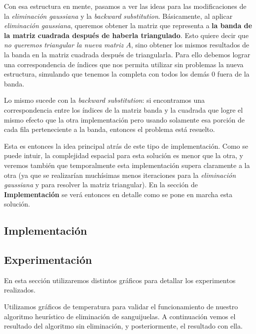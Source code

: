 \vspace{\baselineskip}

\vspace{\baselineskip}
\par

Con esa estructura en mente, pasamos a ver las ideas para las modificaciones de la \textit{eliminación gaussiana} y la \textit{backward substitution}. Básicamente, al aplicar \textit{eliminación gaussiana}, queremos obtener la matriz que representa a \textbf{la banda de la matriz cuadrada después de haberla triangulado}. Esto quiere decir que \textit{no queremos triangular la nueva matriz $A$}, sino obtener los mismos resultados de la banda en la matriz cuadrada después de triangularla. Para ello debemos lograr una correspondencia de índices que nos permita utilizar sin problemas la nueva estructura, simulando que tenemos la completa con todos los demás 0 fuera de la banda.

Lo mismo sucede con la \textit{backward substitution}: si encontramos una correspondencia entre los índices de la matriz banda y la cuadrada que logre el mismo efecto que la otra implementación pero usando solamente esa porción de cada fila perteneciente a la banda, entonces el problema está resuelto.

\vspace{\baselineskip}
Esta es entonces la idea principal atrás de este tipo de implementación. Como se puede intuir, la complejidad espacial para esta solución es menor que la otra, y veremos también que temporalmente esta implementación supera claramente a la otra (ya que se realizarían muchísimas menos iteraciones para la \textit{eliminación gaussiana} y para resolver la matriz triangular). En la sección de \textbf{Implementación} se verá entonces en detalle como se pone en marcha esta solución.

\subsection{Implementación}

\subsection{Experimentación}

	En esta sección utilizaremos distintos gráficos para detallar los experimentos realizados. 

	Utilizamos gráficos de temperatura para validar el funcionamiento de nuestro algoritmo heurístico de eliminación de sanguijuelas. A continuación vemos el resultado del algoritmo sin eliminación, y posteriormente, el resultado con ella.

